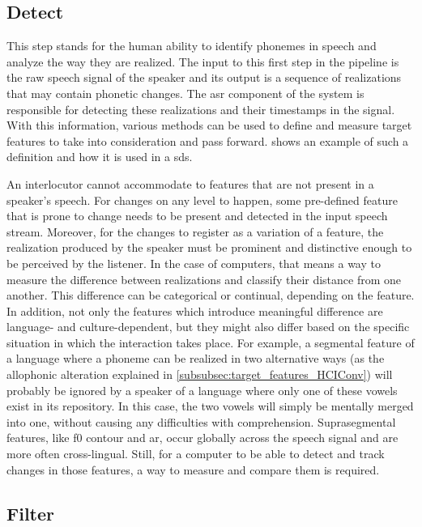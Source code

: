 \subsection{Detect}
\label{subsec:detect}

This step stands for the human ability to identify phonemes in speech and analyze the way they are realized.
The input to this first step in the pipeline is the raw speech signal of the speaker and its output is a sequence of realizations that may contain phonetic changes.
The \ac{asr} component of the system is responsible for detecting these realizations and their timestamps in the signal.
With this information, various methods can be used to define and measure target features to take into consideration and pass forward.
 shows an example of such a definition and how it is used in a \ac{sds}.

An interlocutor cannot accommodate to features that are not present in a speaker's speech.
For changes on any level to happen, some pre-defined feature that is prone to change needs to be present and detected in the input speech stream.
Moreover, for the changes to register as a variation of a feature, the realization produced by the speaker must be prominent and distinctive enough to be perceived by the listener.
In the case of computers, that means a way to measure the difference between realizations and classify their distance from one another.
This difference can be categorical or continual, depending on the feature.
In addition, not only the features which introduce meaningful difference are language- and culture-dependent, but they might also differ based on the specific situation in which the interaction takes place.
For example, a segmental feature of a language where a phoneme can be realized in two alternative ways (as the allophonic alteration explained in \cref{subsubsec:target_features_HCIConv}) will probably be ignored by a speaker of a language where only one of these vowels exist in its repository.
In this case, the two vowels will simply be mentally merged into one, without causing any difficulties with comprehension.
Suprasegmental features, like \ac{f0} contour and \ac{ar}, occur globally across the speech signal and are more often cross-lingual.
Still, for a computer to be able to detect and track changes in those features, a way to measure and compare them is required.

\subsection{Filter}
\label{subsec:filter}

